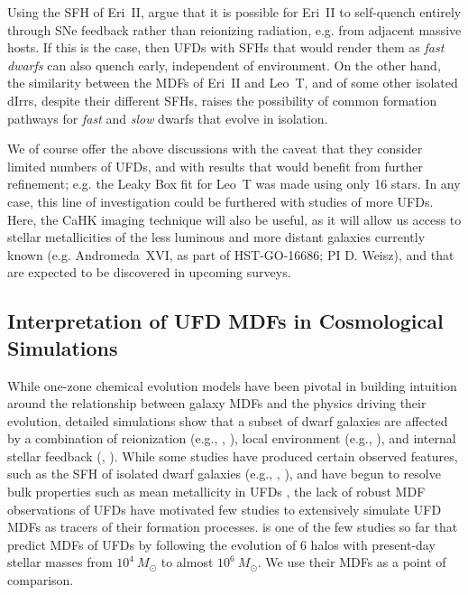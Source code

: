 \documentclass[twocolumn]{aastex63}
\begin{document}
\par Using the SFH of Eri~II, \citet{gallart2021eriii} argue that it is possible for Eri~II to self-quench entirely through SNe feedback rather than reionizing radiation, e.g. from adjacent massive hosts. If this is the case, then UFDs with SFHs that would render them as \textit{fast dwarfs} can also quench early, independent of environment. On the other hand, the similarity between the MDFs of Eri~II and Leo~T, and of some other isolated dIrrs, despite their different SFHs, raises the possibility of common formation pathways for \textit{fast} and \textit{slow} dwarfs that evolve in isolation.

\par We of course offer the above discussions with the caveat that they consider limited numbers of UFDs, and with results that would benefit from further refinement; e.g. the Leaky Box fit for Leo~T was made using only 16 stars. In any case, this line of investigation could be furthered with studies of more UFDs. Here, the CaHK imaging technique will also be useful, as it will allow us access to stellar metallicities of the less luminous and more distant galaxies currently known (e.g. Andromeda~XVI, as part of HST-GO-16686; PI D. Weisz), and that are expected to be discovered in upcoming surveys. 

\subsection{Interpretation of UFD MDFs in Cosmological Simulations}

\par While one-zone chemical evolution models have been pivotal in building intuition around the relationship between galaxy MDFs and the physics driving their evolution, detailed simulations show that a subset of dwarf galaxies are affected by a combination of reionization (e.g., \citealt{dawoodbhoy2018reionization}, \citealt{graus2019reionization}), local environment (e.g., \citealt{applebaum2021}), and internal stellar feedback (\citealt{sun2018discreteSNe}, \citealt{smith2019feedback}). While some studies have produced certain observed features, such as the SFH of isolated dwarf galaxies (e.g., \citealt{fitts2017fieldgalaxies}, \citealt{revaz2018}), and have begun to resolve bulk properties such as mean metallicity in UFDs \citep[e.g., ][]{wheeler2019ufdsims}, the lack of robust MDF observations of UFDs have motivated few studies to extensively simulate UFD MDFs as tracers of their formation processes. \citet{jeon2017popIII} is one of the few studies so far that predict MDFs of UFDs by following the evolution of 6 halos with present-day stellar masses from $10^4~M_{\odot}$ to almost $10^6~M_{\odot}$. We use their MDFs as a point of comparison.
\end{document}
